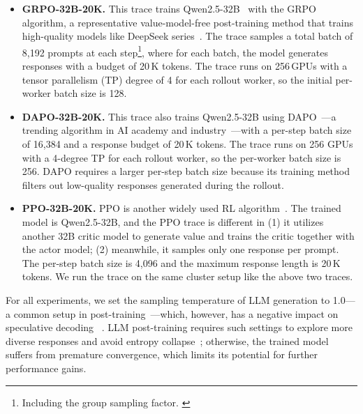 \begin{itemize}[leftmargin=*,leftmargin=10pt,itemindent=0pt]
    \itemsep0.5em
    \item \textbf{GRPO-32B-20K.} 
    This trace trains Qwen2.5-32B~\cite{qwen2.5}
    with the GRPO~\cite{DBLP:journals/corr/abs-2402-03300} algorithm,
    a representative value-model-free post-training method 
    that trains high-quality models like DeepSeek series~\cite{DBLP:journals/corr/abs-2509-02547,deepseek-r1}.
    The trace samples a total batch of 8,192 prompts at each step\footnote{\footnotesize{Including the group sampling factor. }},
    where for each batch, the model generates responses with a budget of 20\,K tokens.
    The trace runs on 256\,GPUs with a tensor parallelism (TP) degree of 4 for
    each rollout worker, so the initial per-worker batch size is 128.  \\[-18pt]

    \item \textbf{DAPO-32B-20K.} 
    This trace also trains Qwen2.5-32B using DAPO~\cite{dapo}---a
    trending algorithm in AI academy and industry~\cite{DBLP:journals/corr/abs-2508-03501,DBLP:journals/corr/abs-2505-23433}---with
    a per-step batch size of 16,384 and a response budget of 20\,K tokens.
    The trace runs on 256 GPUs with a 4-degree TP for each rollout worker,
    so the per-worker batch size is 256.
    DAPO requires a larger per-step batch size because its training
    method filters out low-quality responses generated during the rollout. \\[-18pt]

    \item \textbf{PPO-32B-20K.} 
    PPO is another widely used RL algorithm~\cite{DBLP:journals/corr/SchulmanWDRK17,DBLP:journals/corr/abs-2504-05118}.
    The trained model is Qwen2.5-32B, and the PPO trace is different in 
    (1) it utilizes another 32B critic model to generate value and trains the critic together with the actor model;
    (2) meanwhile, it samples only one response per prompt. The per-step batch size is 4,096 
    and the maximum response length is 20\,K tokens. 
    We run the trace on the same cluster setup like the above two traces. \\[-14pt]
\end{itemize}

\noindent
For all experiments, we set the sampling temperature of LLM generation
to 1.0---a common setup in post-training~\cite{deepseek-r1,DBLP:journals/corr/abs-2402-03300,DBLP:journals/corr/abs-2507-20534}---which, however, 
has a negative impact on speculative decoding
~\cite{DBLP:conf/acl/XiaYDW00L0S24,DBLP:journals/corr/abs-2509-04474,DBLP:journals/corr/abs-2510-26475}.
LLM post-training requires such settings to explore more diverse responses
and avoid entropy collapse~\cite{DBLP:journals/corr/abs-2505-23585,dapo,DBLP:journals/corr/abs-2504-05118};
otherwise, the trained model suffers from premature convergence, 
which limits its potential for further performance gains.

